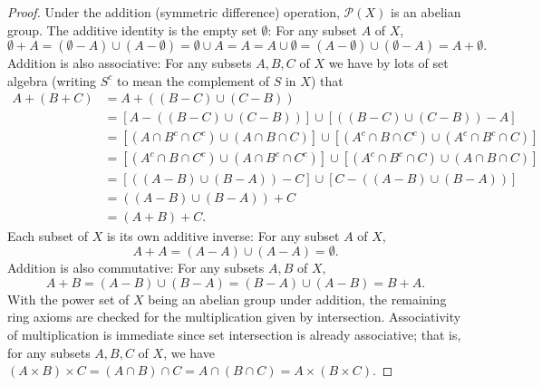 \documentclass[11pt]{article}
\begin{document}
\begin{enumerate}
\begin{enumerate}[label=\textbf{(\alph*)}]
\begin{proof}
            Under the addition (symmetric difference) operation, $\mathcal{P}(X)$ is an abelian group. The additive identity is the empty set $\emptyset$: For any subset $A$ of $X$, \[\emptyset + A = (\emptyset - A)\cup (A - \emptyset) = \emptyset \cup A = A = A \cup \emptyset = (A - \emptyset)\cup (\emptyset - A) = A + \emptyset.\] Addition is also associative: For any subsets $A,B,C$ of $X$ we have by lots of set algebra (writing $S^c$ to mean the complement of $S$ in $X$) that \begin{align*}
                A+ (B+C) &= A + ((B- C)\cup (C-B))\\
                &= [A - ((B- C)\cup (C-B))] \cup [((B- C)\cup (C-B)) - A] \\ &= [(A\cap B^c \cap C^c) \cup (A\cap B\cap C)] \cup [(A^c\cap B\cap C^c) \cup (A^c\cap B^c\cap C)]\\
                &= [(A^c\cap B\cap C^c)\cup (A\cap B^c \cap C^c)]\cup [(A^c\cap B^c\cap C)\cup (A\cap B\cap C)] \\
                &= [((A-B)\cup (B-A)) - C] \cup [C - ((A-B)\cup (B-A))]\\
                &= ((A-B)\cup (B-A)) + C\\
                &= (A+B)+C.
            \end{align*} 
            Each subset of $X$ is its own additive inverse: For any subset $A$ of $X$, \[A + A = (A - A) \cup (A - A) = \emptyset.\] 
            Addition is also commutative: For any subsets $A,B$ of $X$, \[A + B = (A-B)\cup (B-A) = (B-A)\cup(A-B)  = B+ A.\]
            With the power set of $X$ being an abelian group under addition, the remaining ring axioms are checked for the multiplication given by intersection. Associativity of multiplication is immediate since set intersection is already associative; that is, for any subsets $A,B,C$ of $X$, we have $(A\times B)\times C = (A\cap B)\cap C = A\cap(B\cap C) = A\times(B\times C)$.


\end{proof}
\end{enumerate}
\end{enumerate}
\end{document}
